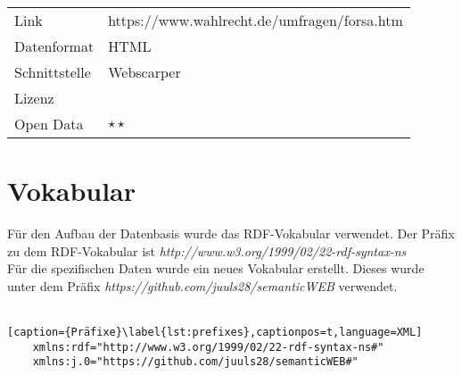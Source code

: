 \documentclass[a4paper,10pt,parskip]{article}
\begin{document}
\vspace{0.5cm}
\begin{tabular}{l|p{9cm}}
	Link & https://www.wahlrecht.de/umfragen/forsa.htm \\
 	Datenformat & HTML \\
 	Schnittstelle & Webscarper \\
 	Lizenz &  \\
 	Open Data & $\star\star$ \\
\end{tabular}

\section{Vokabular}
Für den Aufbau der Datenbasis wurde das RDF-Vokabular verwendet. Der Präfix zu dem RDF-Vokabular ist \textit{http://www.w3.org/1999/02/22-rdf-syntax-ns}\\

Für die spezifischen Daten wurde ein neues Vokabular erstellt. Dieses wurde unter dem Präfix \textit{https://github.com/juuls28/semanticWEB} verwendet.\\ 
\\
\begin{lstlisting}[caption={Präfixe}\label{lst:prefixes},captionpos=t,language=XML] 
    xmlns:rdf="http://www.w3.org/1999/02/22-rdf-syntax-ns#"
    xmlns:j.0="https://github.com/juuls28/semanticWEB#"
\end{lstlisting}
\end{document}
